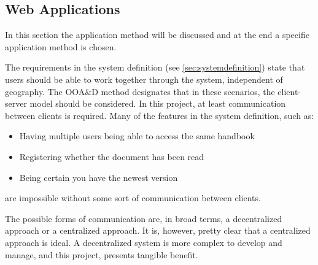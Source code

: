 \subsection{Web Applications}
In this section the application method will be discussed and at the end a specific application method is chosen.

The requirements in the system definition (see \cref{sec:systemdefinition}) state that users should be able to work together through the system, independent of geography.
The OOA\&D method designates that in these scenarios, the client-server model should be considered. \citep[p.~202]{Rod-Aalborg}
In this project, at least communication between clients is required.
Many of the features in the system definition, such as:
\begin{itemize}
\item Having multiple users being able to access the same handbook
\item Registering whether the document has been read
\item Being certain you have the newest version
\end{itemize}
are impossible without some sort of communication between clients.

The possible forms of communication are, in broad terms, a decentralized approach or a centralized approach.
It is, however, pretty clear that a centralized approach is ideal.
A decentralized system is more complex to develop and manage, and this project, presents tangible benefit.

